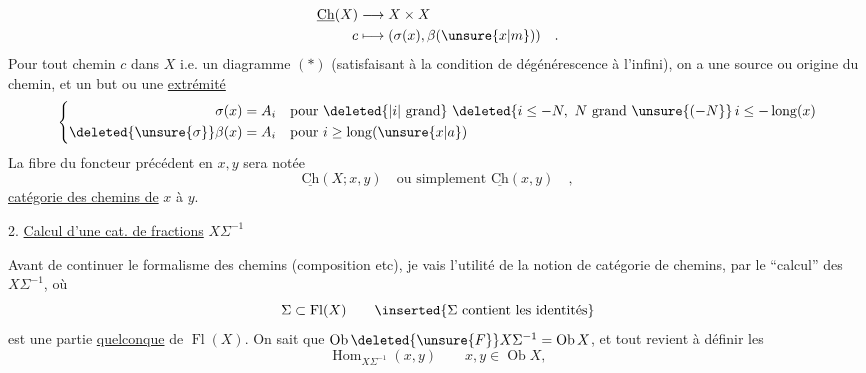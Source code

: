 \[
\begin{aligned}
\underline{\mathrm{Ch}}(X)&\longrightarrow X\times X\\
c&\longmapsto(\sigma(x),\beta(\unsure{x|m}))\quad.
\end{aligned}
\]
Pour tout chemin $c$ dans $X$ i.e. un diagramme $(*)$ (satisfaisant à la condition de dégénérescence à l'infini), on a une source ou origine du chemin, et un but ou une \uline{extrémité}
\[
\left\{\begin{aligned}
\sigma(x)&=A_i\quad\text{pour }\deleted{|i|\ \text{grand}}\ \deleted{i\leq-N,\ N\ \text{grand}\ \unsure{(-N}}\,i\leq-\operatorname{long}(x)\\
\deleted{\unsure{\sigma}}\beta(x)&=A_i\quad\text{pour }i\geq\operatorname{long}(\unsure{x|a})
\end{aligned}\right.
\]
La fibre du  foncteur précédent en $x,y$ sera notée
\[
\underline{\mathrm{Ch}}(X;x,y)\quad\text{ou simplement }\underline{\mathrm{Ch}}(x,y)\quad,
\]
\uline{catégorie des chemins de} $x$ à $y$.

2.  \uline{Calcul d'une cat. de fractions} $X\Sigma^{-1}$

Avant de continuer le formalisme des chemins (composition etc), je vais  l'utilité de la notion de  catégorie de chemins, par le ``calcul'' des $X\Sigma^{-1}$, où
\[
\Sigma\subset\operatorname{Fl}(X)\qquad\inserted{\Sigma\ \text{contient les identités}}
\]
est une partie  \uline{quelconque} de $\operatorname{Fl}(X)$. On sait que $\operatorname{Ob}\deleted{\unsure{F}}X\Sigma^{-1}=\operatorname{Ob}X$, et tout revient à définir 
 les
\[
\operatorname{Hom}_{X\Sigma^{-1}}(x,y)\qquad x,y\in\operatorname{Ob}X,
\]

